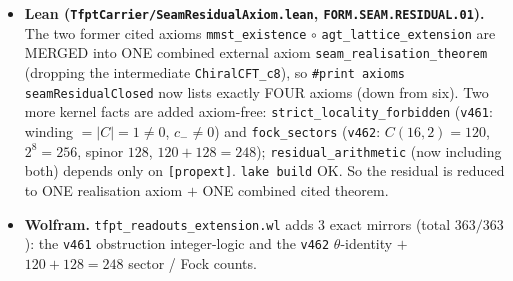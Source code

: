 \documentclass[11pt]{article}
\providecommand{\mE}{\textbf{[E]}}\providecommand{\mC}{\textbf{[C]}}
\providecommand{\mO}{\textbf{[O]}}\providecommand{\mX}{\textbf{[X]}}
\begin{document}
\begin{itemize}
STATES FILL $120{\to}248$: $\chi_o$ gives $120$, $\chi_s$ gives $128$, summing to the exact tower
$\{1,248,4124,34752\}$ ($248{=}120{+}128$). \mE\ FINITE 16-MAJORANA FOCK: $C(16,2){=}120$ NS bilinear currents and
$2^{16/2}{=}256$ Ramond ground states $={}128$ spinor $+$ $128$ cospinor. \mE\ FINITE-$L\to$ CONTINUUM CONVERGENCE:
the critical free-fermion ring Casimir gives $c_-{\to}8$ and the lowest scaled NS gap $x_1{\to}1$ with
$|x_1{-}1|{\sim}1/L^2$ ($L{=}64..1024$). \mC\mO\ AGT/AMT (\texttt{v459}) supply the rigorous extension;
\texttt{SEAM.EQUIV.01} existence (\texttt{v336}) stays \mO. Mixed exact ($\theta$ identity $+$ tower $+$
$120/128/256$, Wolfram-mirrored) $+$ numerical (finite-$L$, Python-only).
\item \textbf{Lean (\texttt{TfptCarrier/SeamResidualAxiom.lean}, \texttt{FORM.SEAM.RESIDUAL.01}).} The two former
cited axioms \texttt{mmst\_existence} $\circ$ \texttt{agt\_lattice\_extension} are MERGED into ONE combined external
axiom \texttt{seam\_realisation\_theorem} (dropping the intermediate \texttt{ChiralCFT\_c8}), so
\texttt{\#print axioms seamResidualClosed} now lists exactly FOUR axioms (down from six). Two more kernel facts are
added axiom-free: \texttt{strict\_locality\_forbidden} (\texttt{v461}: winding $={}|C|{=}1{\neq}0$, $c_-{\neq}0$) and
\texttt{fock\_sectors} (\texttt{v462}: $C(16,2){=}120$, $2^8{=}256$, spinor $128$, $120{+}128{=}248$);
\texttt{residual\_arithmetic} (now including both) depends only on \texttt{[propext]}. \texttt{lake build} OK. So the
residual is reduced to ONE realisation axiom $+$ ONE combined cited theorem.
\item \textbf{Wolfram.} \texttt{tfpt\_readouts\_extension.wl} adds 3 exact mirrors (total $363/363$): the \texttt{v461}
obstruction integer-logic and the \texttt{v462} $\theta$-identity $+$ $120{+}128{=}248$ sector / Fock counts.
\end{itemize}
\end{document}
